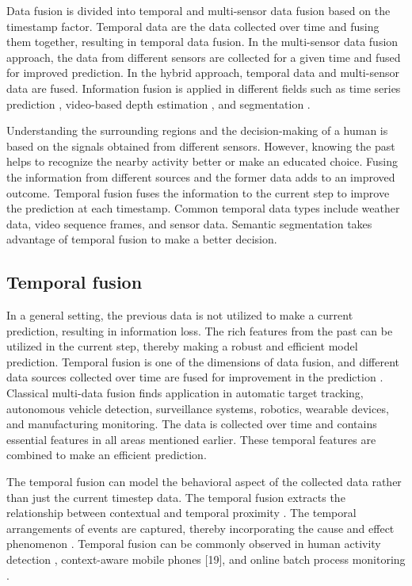 	Data fusion is divided into temporal and multi-sensor data fusion based on the timestamp factor. Temporal data are the data collected over time and fusing them together, resulting in temporal data fusion. In the multi-sensor data fusion approach, the data from different sensors are collected for a given time and fused for improved prediction. In the hybrid approach, temporal data and multi-sensor data are fused. Information fusion is applied in different fields such as time series prediction \cite{02_lim2021temporal}, video-based depth estimation \cite{03_duzceker2021deepvideomvs}, and segmentation \cite{04_li2021spatial}.
	
	Understanding the surrounding regions and the decision-making of a human is based on the signals obtained from different sensors. However, knowing the past helps to recognize the nearby activity better or make an educated choice. Fusing the information from different sources and the former data adds to an improved outcome. Temporal fusion fuses the information to the current step to improve the prediction at each timestamp. Common temporal data types include weather data, video sequence frames, and sensor data. Semantic segmentation takes advantage of temporal fusion to make a better decision. 
    
    \subsection{Temporal fusion}
	
	In a general setting, the previous data is not utilized to make a current prediction, resulting in information loss. The rich features from the past can be utilized in the current step, thereby making a robust and efficient model prediction. Temporal fusion is one of the dimensions of data fusion, and different data sources collected over time are fused for improvement in the prediction \cite{005_hsiao2005temporal}. Classical multi-data fusion finds application in automatic target tracking, autonomous vehicle detection, surveillance systems, robotics, wearable devices, and manufacturing monitoring. The data is collected over time and contains essential features in all areas mentioned earlier. These temporal features are combined to make an efficient prediction. 
    
    The temporal fusion can model the behavioral aspect of the collected data rather than just the current timestep data. The temporal fusion extracts the relationship between contextual and temporal proximity \cite{07_hsiao2005temporal}. The temporal arrangements of events are captured, thereby incorporating the cause and effect phenomenon \cite{07_hsiao2005temporal}. Temporal fusion can be commonly observed in human activity detection \cite{08_krause2003unsupervised}, context-aware mobile phones [19], and online batch process monitoring \cite{09_lee2003line}. 
    
